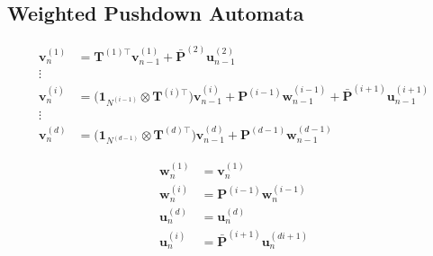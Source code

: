 %

\subsection{Weighted Pushdown Automata}

\begin{align}
    \mathbf{v}_n^{(1)} &= \mathbf{T}^{(1) \top} \mathbf{v}_{n-1}^{(1)} + \mathbf{\bar{P}}^{(2)} \mathbf{u}_{n-1}^{(2)} \\
    \vdots \\
    \mathbf{v}_n^{(i)} &= \big( \mathbf{1}_{N^{(i-1)}} \otimes \mathbf{T}^{(i) \top} \big) \mathbf{v}_{n-1}^{(i)} + \mathbf{P}^{(i-1)} \mathbf{w}_{n-1}^{(i-1)}  + \mathbf{\bar{P}}^{(i+1)} \mathbf{u}_{n-1}^{(i+1)}  \\
    \vdots \\
    \mathbf{v}_n^{(d)} &= \big( \mathbf{1}_{N^{(d-1)}} \otimes \mathbf{T}^{(d) \top} \big) \mathbf{v}_{n-1}^{(d)} + \mathbf{P}^{(d-1)} \mathbf{w}_{n-1}^{(d-1)} 
\end{align}


\begin{align}
    \mathbf{w}_n^{(1)} &= \mathbf{v}^{(1)}_n \\
    \mathbf{w}_n^{(i)} &= \mathbf{P}^{(i-1)} \mathbf{w}_{n}^{(i-1)}  \\
    \mathbf{u}_n^{(d)} &= \mathbf{u}^{(d)}_n \\
    \mathbf{u}_n^{(i)} &= \mathbf{\bar{P}}^{(i+1)} \mathbf{u}_{n}^{(di+1)}
\end{align}
